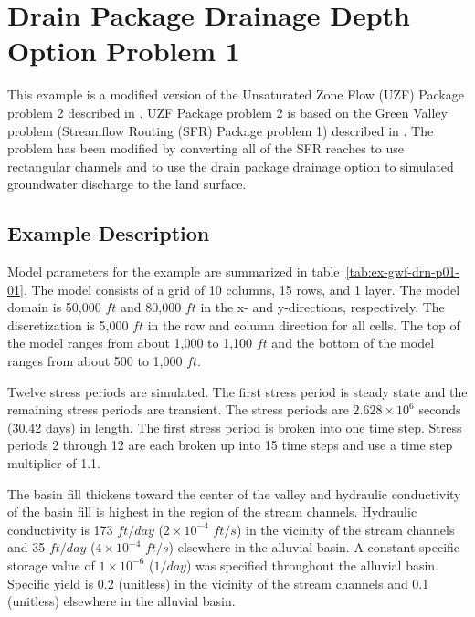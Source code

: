 \section{Drain Package Drainage Depth Option Problem 1}

This example is a modified version of the Unsaturated Zone Flow (UZF) Package problem 2 described in \cite{UZF}. UZF Package problem 2 is based on the Green Valley problem (Streamflow Routing (SFR) Package problem 1) described in \cite{modflowsfr1pack}. The problem has been modified by converting all of the SFR reaches to use rectangular channels and to use the drain package drainage option to simulated groundwater discharge to the land surface.                               

\subsection{Example Description}
Model parameters for the example are summarized in table~\ref{tab:ex-gwf-drn-p01-01}.  The model consists of a grid of 10 columns, 15 rows, and 1 layer. The model domain is  50,000 $ft$ and 80,000 $ft$ in the x- and y-directions, respectively. The discretization is 5,000 $ft$ in the row and column direction for all cells. The top of the model ranges from about 1,000 to 1,100 $ft$ and the bottom of the model ranges from about 500 to 1,000 $ft$.

Twelve stress periods are simulated. The first stress period is steady state and the remaining stress periods are transient. The stress periods are $2.628 \times 10^{6}$ seconds (30.42 days) in length. The first stress period is broken into one time step. Stress periods 2 through 12 are each broken up into 15 time steps and use a time step multiplier of 1.1.



The basin fill thickens toward the center of the valley and hydraulic conductivity of the basin fill is highest in the region of the stream channels. Hydraulic conductivity is 173 $ft/day$ ($2 \times 10^{-4}$ $ft/s$) in the vicinity of the stream channels and 35 $ft/day$ ($4 \times 10^{-4}$ $ft/s$) elsewhere in the alluvial basin. A constant specific storage value of $1 \times 10^{-6}$ ($1/day$) was specified throughout the alluvial basin. Specific yield is 0.2 (unitless) in the vicinity of the stream channels and 0.1 (unitless) elsewhere in the alluvial basin.

